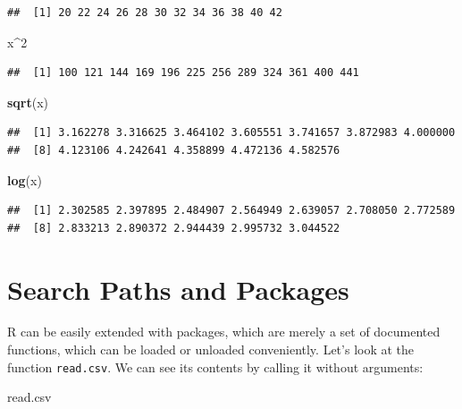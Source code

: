 \documentclass[]{book}
\newenvironment{Shaded}{\begin{snugshade}}{\end{snugshade}}
\newcommand{\DecValTok}[1]{\textcolor[rgb]{0.00,0.00,0.81}{#1}}
\newcommand{\KeywordTok}[1]{\textcolor[rgb]{0.13,0.29,0.53}{\textbf{#1}}}
\newcommand{\NormalTok}[1]{#1}
\newcommand{\OperatorTok}[1]{\textcolor[rgb]{0.81,0.36,0.00}{\textbf{#1}}}
\theoremstyle{definition}
\theoremstyle{definition}
\theoremstyle{definition}
\theoremstyle{remark}
\begin{document}
\begin{verbatim}
##  [1] 20 22 24 26 28 30 32 34 36 38 40 42
\end{verbatim}

\begin{Shaded}
\begin{Highlighting}[]
\NormalTok{x}\OperatorTok{^}\DecValTok{2}    
\end{Highlighting}
\end{Shaded}

\begin{verbatim}
##  [1] 100 121 144 169 196 225 256 289 324 361 400 441
\end{verbatim}

\begin{Shaded}
\begin{Highlighting}[]
\KeywordTok{sqrt}\NormalTok{(x)  }
\end{Highlighting}
\end{Shaded}

\begin{verbatim}
##  [1] 3.162278 3.316625 3.464102 3.605551 3.741657 3.872983 4.000000
##  [8] 4.123106 4.242641 4.358899 4.472136 4.582576
\end{verbatim}

\begin{Shaded}
\begin{Highlighting}[]
\KeywordTok{log}\NormalTok{(x)   }
\end{Highlighting}
\end{Shaded}

\begin{verbatim}
##  [1] 2.302585 2.397895 2.484907 2.564949 2.639057 2.708050 2.772589
##  [8] 2.833213 2.890372 2.944439 2.995732 3.044522
\end{verbatim}

\hypertarget{search-paths-and-packages}{%
\section{Search Paths and Packages}\label{search-paths-and-packages}}

R can be easily extended with packages, which are merely a set of documented functions, which can be loaded or unloaded conveniently.
Let's look at the function \texttt{read.csv}.
We can see its contents by calling it without arguments:

\begin{Shaded}
\begin{Highlighting}[]
\NormalTok{read.csv}
\end{Highlighting}
\end{Shaded}
\end{document}
